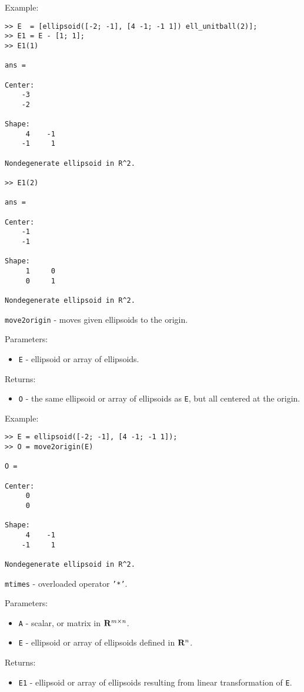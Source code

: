 Example:
{\tt \begin{verbatim}
>> E  = [ellipsoid([-2; -1], [4 -1; -1 1]) ell_unitball(2)];
>> E1 = E - [1; 1];
>> E1(1)

ans =

Center:
    -3
    -2

Shape:
     4    -1
    -1     1

Nondegenerate ellipsoid in R^2.

>> E1(2)

ans =

Center:
    -1
    -1

Shape:
     1     0
     0     1

Nondegenerate ellipsoid in R^2.
\end{verbatim} }

\newpage

{\Large {\tt move2origin}} - moves given ellipsoids to the origin.

Parameters:
\begin{itemize}
\item {\tt E} - ellipsoid or array of ellipsoids.
\end{itemize}

Returns:
\begin{itemize}
\item {\tt O} - the same ellipsoid or array of ellipsoids as {\tt E},
but all centered at the origin.
\end{itemize}

Example:
{\tt \begin{verbatim}
>> E = ellipsoid([-2; -1], [4 -1; -1 1]);
>> O = move2origin(E)

O =

Center:
     0
     0

Shape:
     4    -1
    -1     1

Nondegenerate ellipsoid in R^2.
\end{verbatim} }

\newpage

{\Large {\tt mtimes}} - overloaded operator {\tt '*'}.

Parameters:
\begin{itemize}
\item {\tt A} - scalar, or matrix in ${\bf R}^{m\times n}$.
\item {\tt E} - ellipsoid or array of ellipsoids defined in ${\bf R}^n$.
\end{itemize}

Returns:
\begin{itemize}
\item {\tt E1} - ellipsoid or array of ellipsoids resulting from linear
transformation of {\tt E}.
\end{itemize}

